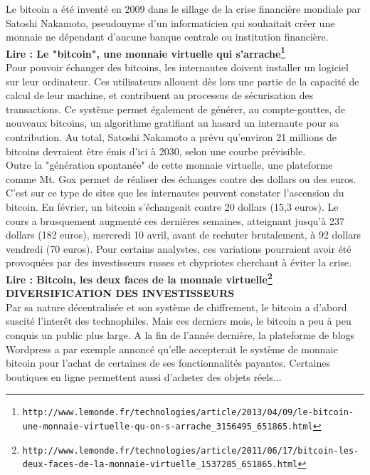 \documentclass[11pt,twoside,a4paper]{article}
\begin{document}
Le bitcoin a {\'e}t{\'e} invent{\'e} en 2009 dans le sillage de la crise financi{\`e}re mondiale par Satoshi Nakamoto, pseudonyme d'un informaticien qui souhaitait cr{\'e}er une monnaie ne d{\'e}pendant d'aucune banque centrale ou institution financi{\`e}re. ~\\

\textbf{Lire : Le "bitcoin", une monnaie virtuelle qui s'arrache\footnote{\texttt{http://www.lemonde.fr/technologies/article/2013/04/09/le-bitcoin-une-monnaie-virtuelle-qu-on-s-arrache\_3156495\_651865.html}}} ~\\

Pour pouvoir {\'e}changer des bitcoins, les internautes doivent installer un logiciel sur leur ordinateur. Ces utilisateurs allouent d{\`e}s lors une partie de la capacit{\'e} de calcul de leur machine, et contribuent au processus de s{\'e}curisation des transactions. Ce syst{\`e}me permet {\'e}galement de g{\'e}n{\'e}rer, au compte-gouttes, de nouveaux bitcoins, un algorithme gratifiant au hasard un internaute pour sa contribution. Au total, Satoshi Nakamoto a pr{\'e}vu qu'environ 21 millions de bitcoins devraient {\^e}tre {\'e}mis d'ici {\`a} 2030, selon une courbe pr{\'e}visible. ~\\

Outre la "g{\'e}n{\'e}ration spontan{\'e}e" de cette monnaie virtuelle, une plateforme comme Mt. Gox permet de r{\'e}aliser des {\'e}changes contre des dollars ou des euros. C'est sur ce type de sites que les internautes peuvent constater l'ascension du bitcoin. En f{\'e}vrier, un bitcoin s'{\'e}changeait contre 20 dollars (15,3 euros). Le cours a brusquement augment{\'e} ces derni{\`e}res semaines, atteignant jusqu'{\`a} 237 dollars (182 euros), mercredi 10 avril, avant de rechuter brutalement, {\`a} 92 dollars vendredi (70 euros). Pour certains analystes, ces variations pourraient avoir {\'e}t{\'e} provoqu{\'e}es par des investisseurs russes et chypriotes cherchant {\`a} {\'e}viter la crise. ~\\

\textbf{Lire : Bitcoin, les deux faces de la monnaie virtuelle\footnote{\texttt{http://www.lemonde.fr/technologies/article/2011/06/17/bitcoin-les-deux-faces-de-la-monnaie-virtuelle\_1537285\_651865.html}}} ~\\

\textbf{DIVERSIFICATION DES INVESTISSEURS} ~\\

Par sa nature d{\'e}centralis{\'e}e et son syst{\`e}me de chiffrement, le bitcoin a d'abord suscit{\'e} l'inter{\^e}t des technophiles. Mais ces derniers mois, le bitcoin a peu {\`a} peu conquis un public plus large. A la fin de l'ann{\'e}e derni{\`e}re, la plateforme de blogs Wordpress a par exemple annonc{\'e} qu'elle accepterait le syst{\`e}me de monnaie bitcoin pour l'achat de certaines de ses fonctionnalit{\'e}s payantes. Certaines boutiques en ligne permettent aussi d'acheter des objets r{\'e}els... ~\\
\end{document}
